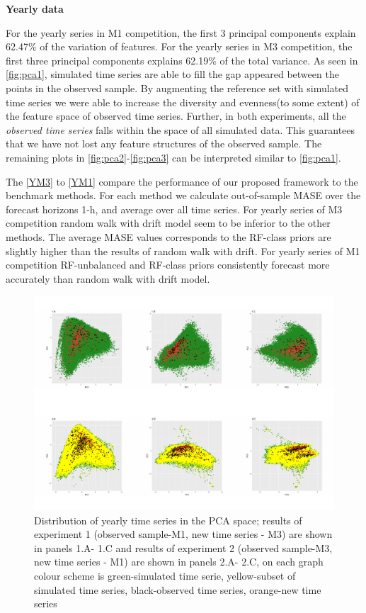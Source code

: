 \documentclass[11pt,]{article}
\theoremstyle{definition}
\theoremstyle{definition}
\theoremstyle{definition}
\theoremstyle{remark}
\begin{document}
\textbf{Yearly data}

For the yearly series in M1 competition, the first 3 principal
components explain 62.47\% of the variation of features. For the yearly
series in M3 competition, the first three principal components explains
62.19\% of the total variance. As seen in \autoref{fig:pca1}, simulated
time series are able to fill the gap appeared between the points in the
observed sample. By augmenting the reference set with simulated time
series we were able to increase the diversity and evenness(to some
extent) of the feature space of observed time series. Further, in both
experiments, all the \emph{observed time series} falls within the space
of all simulated data. This guarantees that we have not lost any feature
structures of the observed sample. The remaining plots in
\autoref{fig:pca2}-\autoref{fig:pca3} can be interpreted similar to
\autoref{fig:pca1}.

The \autoref{YM3} to \autoref{YM1} compare the performance of our
proposed framework to the benchmark methods. For each method we
calculate out-of-sample MASE over the forecast horizons 1-h, and average
over all time series. For yearly series of M3 competition random walk
with drift model seem to be inferior to the other methods. The average
MASE values corresponds to the RF-class priors are slightly higher than
the results of random walk with drift. For yearly series of M1
competition RF-unbalanced and RF-class priors consistently forecast more
accurately than random walk with drift model.

\begin{figure}

{\centering \includegraphics[width=\textwidth]{figure/pca1-1} 

}

\caption{Distribution of yearly time series in the PCA space; results of experiment 1 (observed sample-M1, new time series - M3) are shown in panels 1.A- 1.C and results of experiment 2 (observed sample-M3, new time series - M1) are shown in panels 2.A- 2.C, on each graph colour scheme is green-simulated time serie, yellow-subset of simulated time series, black-observed time series, orange-new time series}\label{fig:pca1}
\end{figure}
\end{document}
